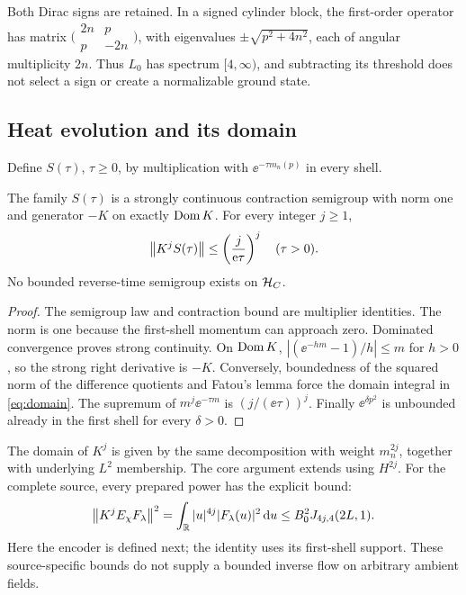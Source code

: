 Both Dirac signs are retained. In a signed cylinder block, the first-order
operator has matrix \(\bigl(\begin{smallmatrix}2n&p\\p&-2n\end{smallmatrix}\bigr)\),
with eigenvalues \(\pm\sqrt{p^2+4n^2}\), each of angular multiplicity
\(2n\). Thus \(L_0\) has spectrum \([4,\infty)\), and subtracting its
threshold does not select a sign or create a normalizable ground state.

\subsection{Heat evolution and its domain}
Define \(S(\tau)\), \(\tau\geq0\), by multiplication with
\(\ee^{-\tau m_n(p)}\) in every shell.

\begin{proposition}\label{prop:semigroup}
The family \(S(\tau)\) is a strongly continuous contraction semigroup
with norm one and generator \(-K\) on exactly \(\operatorname{Dom} K\). For every
integer \(j\geq1\),
\begin{equation}\label{eq:smoothing}
 \left\lVert K^jS(\tau)\right\rVert\leq\left(\frac{j}{\mathrm e\tau}\right)^j\quad(\tau>0).
\end{equation}
No bounded reverse-time semigroup exists on \(\mathcal H_C\).
\end{proposition}
\begin{proof}
The semigroup law and contraction bound are multiplier identities.
The norm is one because the first-shell momentum can approach zero.
Dominated convergence proves strong continuity. On \(\operatorname{Dom} K\),
\(|(\ee^{-hm}-1)/h|\leq m\) for \(h>0\), so the strong right
derivative is \(-K\). Conversely, boundedness of the squared norm of
the difference quotients and Fatou's lemma force the domain integral
in \eqref{eq:domain}. The supremum of \(m^j\ee^{-\tau m}\) is
\((j/(\ee\tau))^j\). Finally \(\ee^{\delta p^2}\) is unbounded
already in the first shell for every \(\delta>0\).
\end{proof}

The domain of \(K^j\) is given by the same decomposition with weight
\(m_n^{2j}\), together with underlying \(L^2\) membership.
The core argument extends using \(H^{2j}\). For the complete source,
every prepared power has the explicit bound:
\begin{equation}\label{eq:prepared-power}
 \left\lVert K^jE_\chi F_\lambda\right\rVert^2
 =\int_\mathbb R |u|^{4j}|F_\lambda(u)|^2\,\mathrm d u
 \leq B_0^2J_{4j,4}(2L,1).
\end{equation}
Here the encoder is defined next; the identity uses its first-shell
support. These source-specific bounds do not supply a bounded inverse
flow on arbitrary ambient fields.

